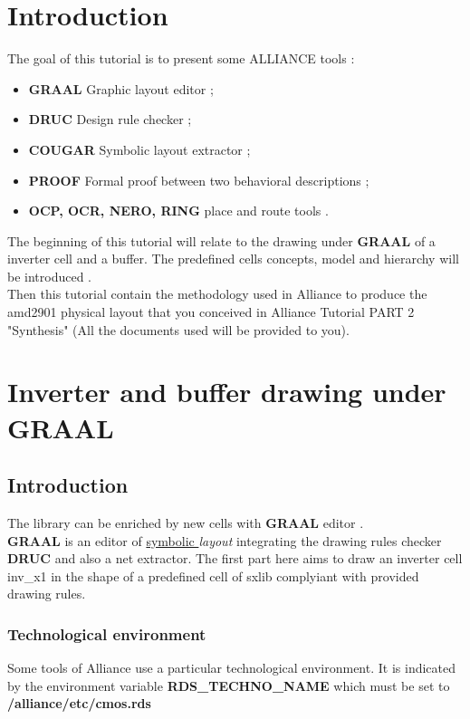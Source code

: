 \documentclass[12pt]{article}
\begin{document}
\newpage

\section{Introduction}
 The goal of this tutorial is to present some ALLIANCE tools :
\begin{itemize}\itemsep=-.4ex
\item   {\bf GRAAL} Graphic layout editor ;
\item   {\bf DRUC} Design rule checker ;
\item   {\bf COUGAR} Symbolic layout extractor ;
\item   {\bf PROOF} Formal proof between two behavioral descriptions ;
\item   {\bf OCP, OCR, NERO, RING} place and route tools .
\end{itemize}

The beginning of this tutorial will relate to the drawing under {
\bf GRAAL } of a inverter cell and a buffer.
The predefined cells concepts, model and
hierarchy will be introduced .\\
Then this tutorial contain the methodology used in Alliance to produce
the amd2901 physical layout that you conceived in Alliance Tutorial 
PART 2 "Synthesis" (All the documents used will be provided to you).
 
\newpage

\section{Inverter and buffer drawing under GRAAL}

\subsection{Introduction}
    The library can be enriched by new cells with {\bf GRAAL} editor .\\
{ \bf GRAAL } is an editor of \/{\underline{symbolic }} {\it
layout} integrating the drawing rules checker {\bf DRUC} and also 
a net extractor.
 The first part here aims to draw an inverter cell inv\_x1 in the shape
of a predefined cell of sxlib complyiant with provided
drawing rules.

\subsubsection{Technological environment}
Some tools of Alliance use a particular technological
environment. It is indicated by the environment variable {\bf
RDS\_TECHNO\_NAME} which must be set to
{\bf/alliance/etc/cmos.rds}
\end{document}
